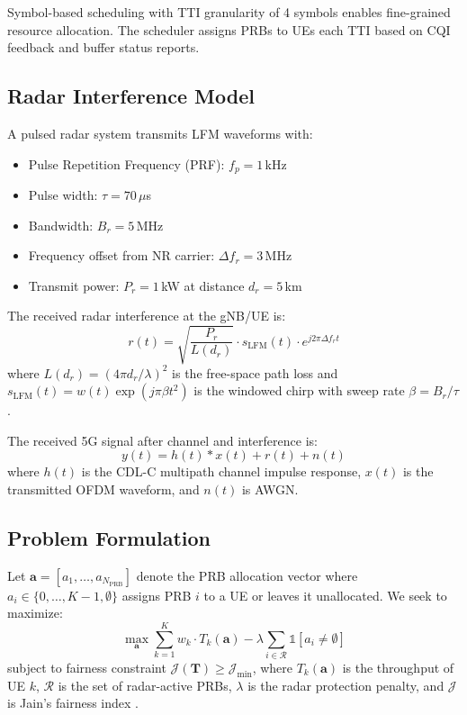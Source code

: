 \documentclass[conference]{IEEEtran}
\begin{document}
Symbol-based scheduling with TTI granularity of 4 symbols enables fine-grained resource allocation. The scheduler assigns PRBs to UEs each TTI based on CQI feedback and buffer status reports.

\subsection{Radar Interference Model}

A pulsed radar system transmits LFM waveforms with:
\begin{itemize}
    \item Pulse Repetition Frequency (PRF): $f_p = 1$\,kHz
    \item Pulse width: $\tau = 70\,\mu$s
    \item Bandwidth: $B_r = 5$\,MHz
    \item Frequency offset from NR carrier: $\Delta f_r = 3$\,MHz
    \item Transmit power: $P_r = 1$\,kW at distance $d_r = 5$\,km
\end{itemize}

The received radar interference at the gNB/UE is:
\begin{equation}
    r(t) = \sqrt{\frac{P_r}{L(d_r)}} \cdot s_{\text{LFM}}(t) \cdot e^{j2\pi \Delta f_r t}
    \label{eq:radar_rx}
\end{equation}
where $L(d_r) = (4\pi d_r / \lambda)^2$ is the free-space path loss and $s_{\text{LFM}}(t) = w(t) \exp(j\pi \beta t^2)$ is the windowed chirp with sweep rate $\beta = B_r / \tau$.

The received 5G signal after channel and interference is:
\begin{equation}
    y(t) = h(t) * x(t) + r(t) + n(t)
    \label{eq:rx_signal}
\end{equation}
where $h(t)$ is the CDL-C multipath channel impulse response, $x(t)$ is the transmitted OFDM waveform, and $n(t)$ is AWGN.

\subsection{Problem Formulation}

Let $\mathbf{a} = [a_1, \ldots, a_{N_{\text{PRB}}}]$ denote the PRB allocation vector where $a_i \in \{0, \ldots, K-1, \emptyset\}$ assigns PRB $i$ to a UE or leaves it unallocated. We seek to maximize:
\begin{equation}
    \max_{\mathbf{a}} \sum_{k=1}^{K} w_k \cdot T_k(\mathbf{a}) - \lambda \sum_{i \in \mathcal{R}} \mathbb{1}[a_i \neq \emptyset]
    \label{eq:objective}
\end{equation}
subject to fairness constraint $\mathcal{J}(\mathbf{T}) \geq \mathcal{J}_{\min}$, where $T_k(\mathbf{a})$ is the throughput of UE $k$, $\mathcal{R}$ is the set of radar-active PRBs, $\lambda$ is the radar protection penalty, and $\mathcal{J}$ is Jain's fairness index \cite{jain1984fairness}.
\end{document}
